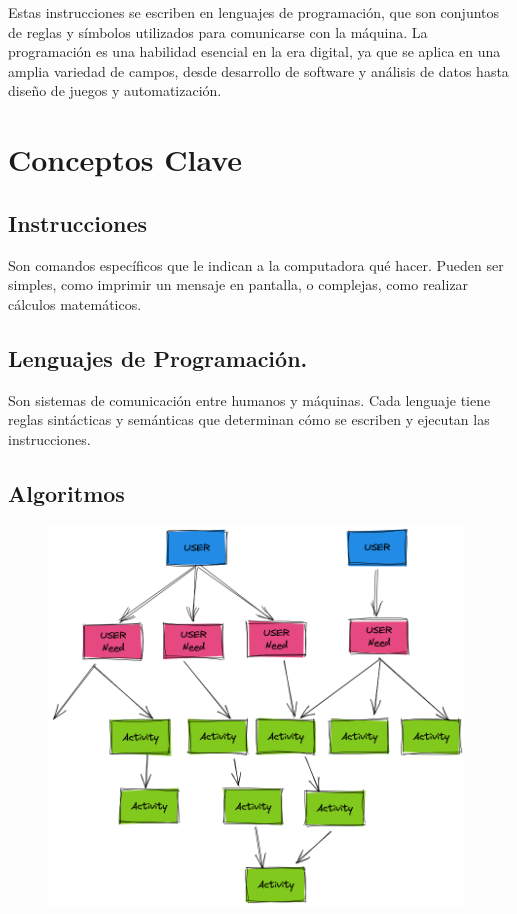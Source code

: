 \documentclass[
  a4paper,
  DIV=11,
  numbers=noendperiod,
  onepage,
  openany]{scrreprt}
\begin{document}
Estas instrucciones se escriben en lenguajes de programación, que son
conjuntos de reglas y símbolos utilizados para comunicarse con la
máquina. La programación es una habilidad esencial en la era digital, ya
que se aplica en una amplia variedad de campos, desde desarrollo de
software y análisis de datos hasta diseño de juegos y automatización.

\section{Conceptos Clave}\label{conceptos-clave}

\subsection{Instrucciones}\label{instrucciones}

Son comandos específicos que le indican a la computadora qué hacer.
Pueden ser simples, como imprimir un mensaje en pantalla, o complejas,
como realizar cálculos matemáticos.

\subsection{Lenguajes de
Programación.}\label{lenguajes-de-programaciuxf3n.}

Son sistemas de comunicación entre humanos y máquinas. Cada lenguaje
tiene reglas sintácticas y semánticas que determinan cómo se escriben y
ejecutan las instrucciones.

\subsection{Algoritmos}\label{algoritmos}

\begin{figure}

{\centering \includegraphics[width=4.34375in,height=\textheight]{unidades/unidad1/images/algoritmo.png}

}

\end{figure}
\end{document}

